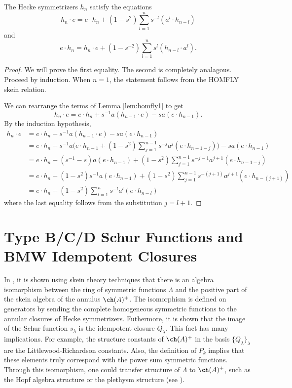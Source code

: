 \begin{theorem} \label{prop:homfly2}
The Hecke symmetrizers $h_n$ satisfy the equations
\[
h_n \cdot e = e \cdot h_n + ( 1 - s^2 ) \sum_{l=1}^{n} s^{-l} ( a^l \cdot h_{n-l} )
\]
and
\[
e \cdot h_n = h_n \cdot e + (1 - s^{-2} ) \sum_{l=1}^{n} s^l ( h_{n-l} \cdot a^l ).
\]
\end{theorem}
\begin{proof}
We will prove the first equality. The second is completely analagous. Proceed by induction. When $n=1$, the statement follows from the HOMFLY skein relation. 

We can rearrange the terms of Lemma \ref{lem:homfly1} to get
\begin{equation} \label{eq:homfly1b}
h_n \cdot e = e \cdot h_n + s^{-1} a ( h_{n-1} \cdot e ) - s a ( e \cdot h_{n-1} ).
\end{equation}
By the induction hypothesis,
\begin{align*}
h_n \cdot e & = e \cdot h_n + s^{-1} a ( h_{n-1} \cdot e ) - s a ( e \cdot h_{n-1} ) \\
& = e \cdot h_n + s^{-1} a \Big( e \cdot h_{n-1} + ( 1 - s^2 ) \sum_{j=1}^{n-1} s^{-j} a^j ( e \cdot h_{n-1-j} ) \Big) - s a ( e \cdot h_{n-1} ) \\
& = e \cdot h_n + ( s^{-1} - s ) a ( e \cdot h_{n-1} ) + ( 1 - s^2 ) \sum_{j=1}^{n-1} s^{-j-1} a^{j+1} ( e \cdot h_{n-1-j} ) \\ 
& = e \cdot h_n + ( 1 - s^2 ) s^{-1} a ( e \cdot h_{n-1} ) + ( 1 - s^2 ) \sum_{j=1}^{n-1} s^{-(j+1)} a^{j+1} ( e \cdot h_{n-(j+1)} ) \\
&= e \cdot h_n + ( 1 - s^2 ) \sum_{l=1}^{n} s^{-l} a^{l} ( e \cdot h_{n-l} )
\end{align*}
where the last equality follows from the substitution $j=l+1$. 
\end{proof}











\section{Type B/C/D Schur Functions and BMW Idempotent Closures} \label{sec:Lukac}
In , it is shown using skein theory techniques that there is an algebra isomorphism between the ring of symmetric functions $\Lambda$ and the positive part of the skein algebra of the annulus $\ch(A)^+$. The isomorphism is defined on generators by sending the complete homogeneous symmetric functions to the annular closures of Hecke symmetrizers. Futhermore, it is shown that the image of the Schur function $s_\lambda$ is the idempotent closure $Q_\lambda$. This fact has many implications. For example, the structure constants of $\ch(A)^+$ in the basis $\{ Q_\lambda \}_\lambda$ are the Littlewood-Richardson constants. Also, the definition of $P_k$ implies that these elements truly correspond with the power sum symmetric functions. Through this isomorphism, one could transfer structure of $\Lambda$ to $\ch(A)^+$, such as the Hopf algebra structure or the plethysm structure (see ). 

